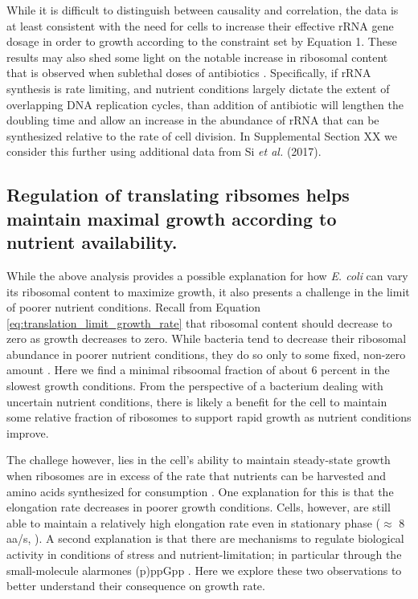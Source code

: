 While it is difficult to distinguish between causality and correlation, the data
is at least consistent with the need for cells to increase their effective rRNA
gene dosage in order to growth according to the constraint set by Equation 1.
These results may also shed some light on the notable increase in ribosomal
content that is observed when sublethal doses of antibiotics \citep{scott2010,
dai2016}. Specifically, if rRNA synthesis is rate limiting, and nutrient
conditions largely dictate the extent of overlapping DNA replication cycles,
than addition of antibiotic will lengthen the doubling time and allow an
increase in the abundance of rRNA that can be synthesized relative to the rate
of cell division. In Supplemental Section XX we consider this further using
additional data from Si \textit{et al.} (2017).

\subsection{Regulation of translating ribsomes helps maintain maximal growth
according to nutrient availability.}

While the above analysis provides a possible explanation for how \textit{E. coli}
can vary its ribosomal content to maximize growth, it also presents a
challenge in the limit of poorer nutrient conditions. Recall from Equation
\ref{eq:translation_limit_growth_rate} that ribosomal content should decrease to
zero as growth decreases to zero. While bacteria tend to decrease their
ribosomal abundance in poorer nutrient conditions, they do so only to some
fixed, non-zero amount \citep{scott2010, liebermeister2014}. Here we find a
minimal ribsoomal fraction of about 6 percent in the slowest growth conditions.
From the perspective of a bacterium dealing with uncertain nutrient conditions,
there is likely a benefit for the cell to maintain some relative fraction of
ribosomes to support rapid growth as nutrient conditions improve.

The challege however, lies in the cell's ability to maintain steady-state growth
when ribosomes are in excess of the rate that nutrients can be harvested and
amino  acids synthesized for consumption . One
explanation for this is that the elongation rate decreases in poorer growth
conditions. Cells, however, are still able to maintain a relatively high
elongation rate even in stationary phase ($\approx$ 8 aa/s, \citep{dai2016,
dai2018}). A second explanation is that there are mechanisms to
regulate biological activity in conditions of stress and nutrient-limitation; in
particular through the small-molecule alarmones (p)ppGpp \citep{harris2018}.
Here we explore these two observations to better understand
their consequence on growth rate.

